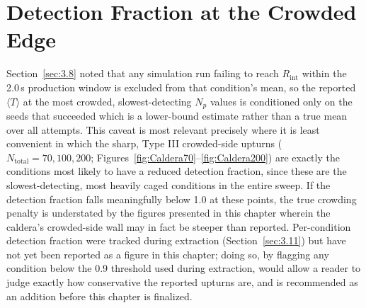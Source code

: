 \section{Detection Fraction at the Crowded Edge}
\label{sec:4.11}
Section~\ref{sec:3.8} noted that any simulation run failing to reach $R_\text{int}$ within the 2.0\,s production window is excluded from that condition's mean, so the reported $\langle T \rangle$ at the most crowded, slowest-detecting $N_p$ values is conditioned only on the seeds that succeeded which is a lower-bound estimate rather than a true mean over all attempts. This caveat is most relevant precisely where it is least convenient in which the sharp, Type III crowded-side upturns ($N_\text{total}=70,100,200$; Figures~\ref{fig:Caldera70}--\ref{fig:Caldera200}) are exactly the conditions most likely to have a reduced detection fraction, since these are the slowest-detecting, most heavily caged conditions in the entire sweep. If the detection fraction falls meaningfully below 1.0 at these points, the true crowding penalty is understated by the figures presented in this chapter wherein the caldera's crowded-side wall may in fact be steeper than reported. Per-condition detection fraction were tracked during extraction (Section~\ref{sec:3.11}) but have not yet been reported as a figure in this chapter; doing so, by flagging any condition below the 0.9 threshold used during extraction, would allow a reader to judge exactly how conservative the reported upturns are, and is recommended as an addition before this chapter is finalized.

